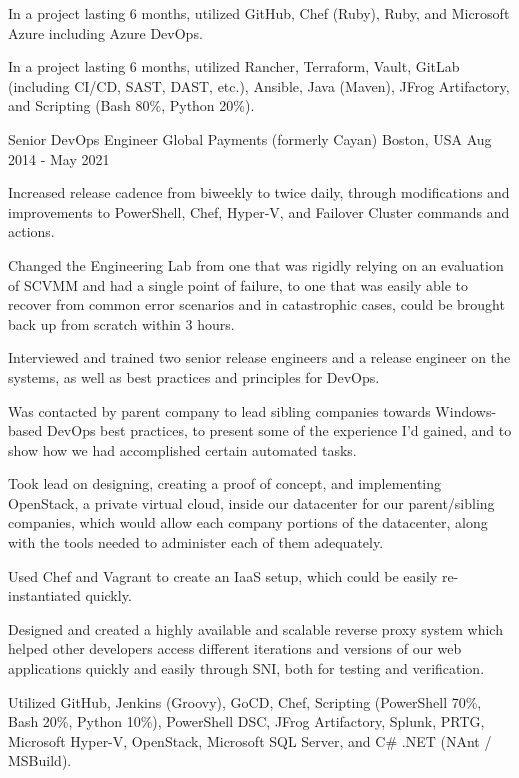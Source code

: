 \begin{cventries}
{\begin{cvitems}
        \item {In a project lasting 6 months, utilized GitHub, Chef (Ruby), Ruby, and Microsoft Azure including Azure DevOps.}
        \item {In a project lasting 6 months, utilized Rancher, Terraform, Vault, GitLab (including CI/CD, SAST, DAST, etc.), Ansible, Java (Maven), JFrog Artifactory, and Scripting (Bash 80\%, Python 20\%).}
      \end{cvitems}
    }

  \cventry
    {Senior DevOps Engineer} %
    {Global Payments (formerly Cayan)} %
    {Boston, USA} %
    {Aug 2014 - May 2021} %
    {
      \begin{cvitems} %
        \item {Increased release cadence from biweekly to twice daily, through modifications and improvements to PowerShell, Chef, Hyper-V, and Failover Cluster commands and actions.}
        \item {Changed the Engineering Lab from one that was rigidly relying on an evaluation of SCVMM and had a single point of failure, to one that was easily able to recover from common error scenarios and in catastrophic cases, could be brought back up from scratch within 3 hours.}
        \item {Interviewed and trained two senior release engineers and a release engineer on the systems, as well as best practices and principles for DevOps.}
        \item {Was contacted by parent company to lead sibling companies towards Windows-based DevOps best practices, to present some of the experience I'd gained, and to show how we had accomplished certain automated tasks.}
        \item {Took lead on designing, creating a proof of concept, and implementing OpenStack, a private virtual cloud, inside our datacenter for our parent/sibling companies, which would allow each company portions of the datacenter, along with the tools needed to administer each of them adequately.}
        \item {Used Chef and Vagrant to create an IaaS setup, which could be easily re-instantiated quickly.}
        \item {Designed and created a highly available and scalable reverse proxy system which helped other developers access different iterations and versions of our web applications quickly and easily through SNI, both for testing and verification.}
        \item {Utilized GitHub, Jenkins (Groovy), GoCD, Chef, Scripting (PowerShell 70\%, Bash 20\%, Python 10\%), PowerShell DSC, JFrog Artifactory, Splunk, PRTG, Microsoft Hyper-V, OpenStack, Microsoft SQL Server, and C\# .NET (NAnt / MSBuild).}
      \end{cvitems}
    }


\end{cventries}
